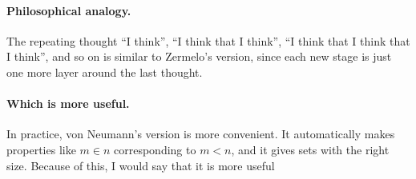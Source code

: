 \documentclass[11pt]{article}
\begin{document}
\paragraph{Philosophical analogy.}
The repeating thought “I think”, “I think that I think”, “I think that I think that I think”, and so on is similar to Zermelo’s version, since each new stage is just one more layer around the last thought.

\paragraph{Which is more useful.}
In practice, von Neumann’s version is more convenient. It automatically makes properties like $m\in n$ corresponding to $m<n$, and it gives sets with the right size. Because of this, I would say that it is more useful
\end{document}
